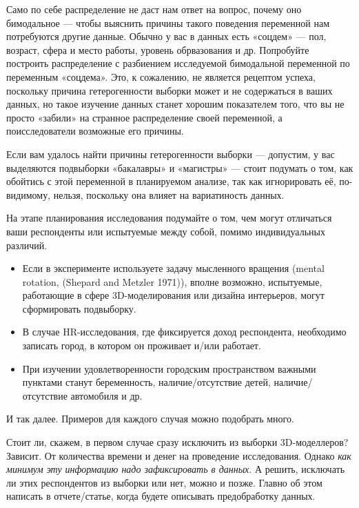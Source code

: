 \documentclass[
  letterpaper,
  DIV=11,
  numbers=noendperiod]{scrreprt}
\providecommand{\tightlist}{%
  \setlength{\itemsep}{0pt}\setlength{\parskip}{0pt}}\usepackage{longtable,booktabs,array}
\theoremstyle{definition}
\theoremstyle{remark}
\begin{document}
Само по себе распределение не даст нам ответ на вопрос, почему оно
бимодальное --- чтобы выяснить причины такого поведения переменной нам
потребуются другие данные. Обычно у вас в данных есть «соцдем» --- пол,
возраст, сфера и место работы, уровень обрвазования и др. Попробуйте
построить распределение с разбиением исследуемой бимодальной переменной
по переменным «соцдема». Это, к сожалению, не является рецептом успеха,
поскольку причина гетерогенности выборки может и не содержаться в ваших
данных, но такое изучение данных станет хорошим показателем того, что вы
не просто «забили» на странное распределение своей переменной, а
поисследователи возможные его причины.

Если вам удалось найти причины гетерогенности выборки --- допустим, у
вас выделяются подвыборки «бакалавры» и «магистры» --- стоит подумать о
том, как обойтись с этой переменной в планируемом анализе, так как
игнорировать её, по-видимому, нельзя, поскольку она влияет на
вариатиность данных.

\begin{tcolorbox}[enhanced jigsaw, opacitybacktitle=0.6, breakable, colbacktitle=quarto-callout-tip-color!10!white, colback=white, coltitle=black, rightrule=.15mm, bottomtitle=1mm, colframe=quarto-callout-tip-color-frame, toptitle=1mm, titlerule=0mm, leftrule=.75mm, arc=.35mm, bottomrule=.15mm, toprule=.15mm, title=\textcolor{quarto-callout-tip-color}{\faLightbulb}\hspace{0.5em}{Соцдем лишним не бывает}, left=2mm, opacityback=0]

На этапе планирования исследования подумайте о том, чем могут отличаться
ваши респонденты или испытуемые между собой, помимо индивидуальных
различий.

\begin{itemize}
\tightlist
\item
  Если в эксперименте используете задачу мысленного вращения (mental
  rotation, (Shepard and Metzler 1971)), вполне возможно, испытуемые,
  работающие в сфере 3D-моделирования или дизайна интерьеров, могут
  сформировать подвыборку.
\item
  В случае HR-исследования, где фиксируется доход респондента,
  необходимо записать город, в котором он проживает и/или работает.
\item
  При изучении удовлетворенности городским пространством важными
  пунктами станут беременность, наличие/отсутствие детей,
  наличие/отсутствие автомобиля и др.
\end{itemize}

И так далее. Примеров для каждого случая можно подобрать много.

Стоит ли, скажем, в первом случае сразу исключить из выборки
3D-моделлеров? Зависит. От количества времени и денег на проведение
исследования. Однако \emph{как минимум эту информацию надо зафиксировать
в данных}. А решить, исключать ли этих респондентов из выборки или нет,
можно и позже. Главно об этом написать в отчете/статье, когда будете
описывать предобработку данных.

\end{tcolorbox}
\end{document}
